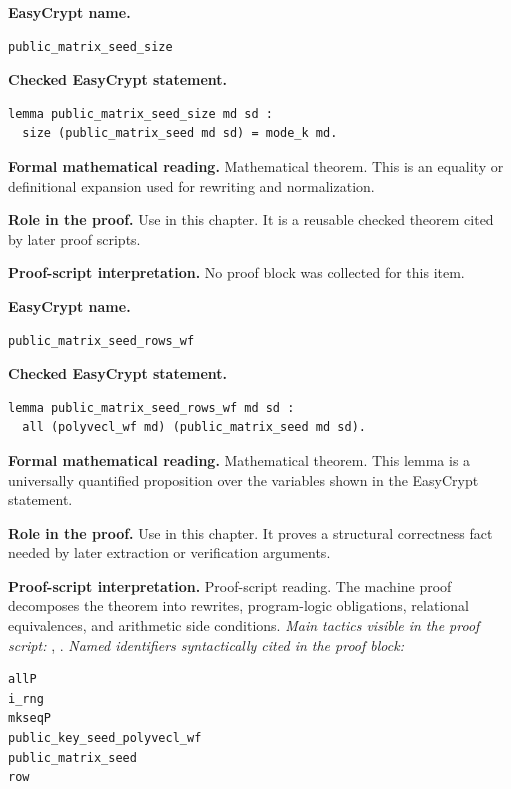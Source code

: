 \begin{formaltheorem}
\noindent\textbf{EasyCrypt name.}
\begin{lstlisting}[language=EasyCrypt,basicstyle=\ttfamily\scriptsize]
public_matrix_seed_size
\end{lstlisting}
\noindent\textbf{Checked EasyCrypt statement.}
\begin{lstlisting}[language=EasyCrypt,basicstyle=\ttfamily\scriptsize]
lemma public_matrix_seed_size md sd :
  size (public_matrix_seed md sd) = mode_k md.
\end{lstlisting}
\noindent\textbf{Formal mathematical reading.}
Mathematical theorem. This is an equality or definitional expansion used for rewriting and normalization.

\noindent\textbf{Role in the proof.}
Use in this chapter. It is a reusable checked theorem cited by later proof scripts.

\noindent\textbf{Proof-script interpretation.}
No proof block was collected for this item.

\end{formaltheorem}

\begin{formaltheorem}
\noindent\textbf{EasyCrypt name.}
\begin{lstlisting}[language=EasyCrypt,basicstyle=\ttfamily\scriptsize]
public_matrix_seed_rows_wf
\end{lstlisting}
\noindent\textbf{Checked EasyCrypt statement.}
\begin{lstlisting}[language=EasyCrypt,basicstyle=\ttfamily\scriptsize]
lemma public_matrix_seed_rows_wf md sd :
  all (polyvecl_wf md) (public_matrix_seed md sd).
\end{lstlisting}
\noindent\textbf{Formal mathematical reading.}
Mathematical theorem. This lemma is a universally quantified proposition over the variables shown in the EasyCrypt statement.

\noindent\textbf{Role in the proof.}
Use in this chapter. It proves a structural correctness fact needed by later extraction or verification arguments.

\noindent\textbf{Proof-script interpretation.}
Proof-script reading. The machine proof decomposes the theorem into rewrites, program-logic obligations, relational equivalences, and arithmetic side conditions.
\emph{Main tactics visible in the proof script:} , .
\emph{Named identifiers syntactically cited in the proof block:}
\begin{lstlisting}[language=EasyCrypt,basicstyle=\ttfamily\scriptsize]
allP
i_rng
mkseqP
public_key_seed_polyvecl_wf
public_matrix_seed
row
\end{lstlisting}

\end{formaltheorem}


